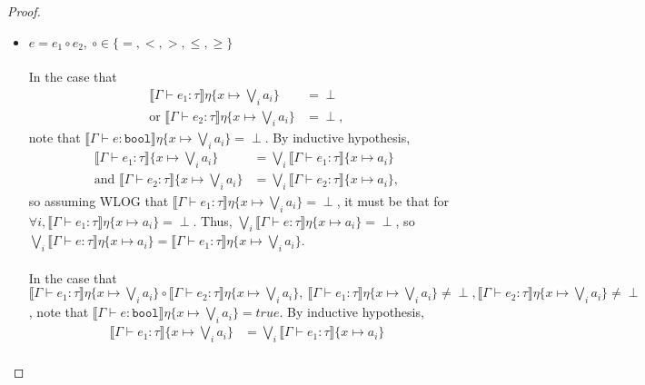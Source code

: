 \begin{proof}
\begin{itemize}
  \item $e = e_1 \circ e_2, \ \circ \in \{=,<,>,\leq,\geq\}$\\ \\
  In the case that 
 \begin{align*}
  \llbracket \Gamma \vdash e_1 : \tau \rrbracket\eta\{x\mapsto  \bigvee_i a_i\} &= \perp \\ 
  \text{or }  \llbracket \Gamma \vdash e_2 : \tau \rrbracket\eta\{x\mapsto  \bigvee_i a_i\} &= \perp,
  \end{align*} 
  note that $\llbracket \Gamma \vdash e : \texttt{bool}\rrbracket\eta\{x\mapsto  \bigvee_i a_i\} = \perp$. 
  By inductive hypothesis, 
  \begin{align*}
  \llbracket \Gamma \vdash e_1 : \tau \rrbracket\{x\mapsto  \bigvee_i a_i\} &= \bigvee_i\llbracket \Gamma \vdash e_1 : \tau \rrbracket\{x\mapsto a_i\} \\
 \text{and } \llbracket \Gamma \vdash e_2 : \tau \rrbracket\{x\mapsto  \bigvee_i a_i\} &= \bigvee_i\llbracket \Gamma \vdash e_2 : \tau \rrbracket\{x\mapsto a_i\}, 
  \end{align*}
  so assuming WLOG that $\llbracket \Gamma \vdash e_1 : \tau \rrbracket\eta\{x\mapsto  \bigvee_i a_i\} = \perp$, 
  it must be that for \\
  $\forall i, \llbracket \Gamma \vdash e_1 : \tau \rrbracket\eta\{x\mapsto a_i\} = \perp$. 
  Thus, $\bigvee_i\llbracket \Gamma \vdash e : \tau \rrbracket\eta\{x\mapsto a_i\} = \perp$, so \\
  $\bigvee_i\llbracket \Gamma \vdash e : \tau \rrbracket\eta\{x\mapsto a_i\} = 
  \llbracket \Gamma \vdash e_1 : \tau \rrbracket\eta\{x\mapsto  \bigvee_i a_i\}$.\\ \\
  In the case that $\llbracket \Gamma \vdash e_1 : \tau \rrbracket\eta\{x\mapsto  \bigvee_i a_i\} 
  \circ \llbracket \Gamma \vdash e_2 : \tau \rrbracket\eta\{x\mapsto  \bigvee_i a_i\}, \ 
  \llbracket \Gamma \vdash e_1:\tau \rrbracket\eta\{x\mapsto  \bigvee_i a_i\} \neq \perp, 
  \llbracket \Gamma \vdash e_2 : \tau \rrbracket\eta\{x\mapsto  \bigvee_i a_i\} \neq \perp$, 
  note that $\llbracket \Gamma \vdash e : \texttt{bool}\rrbracket\eta\{x\mapsto  \bigvee_i a_i\} = true$. 
 By inductive hypothesis, 
  \begin{align*}
  \llbracket \Gamma \vdash e_1 : \tau \rrbracket\{x\mapsto  \bigvee_i a_i\} &= \bigvee_i\llbracket \Gamma \vdash e_1 : \tau \rrbracket\{x\mapsto a_i\} \\

\end{align*}
\end{itemize}
\end{proof}
